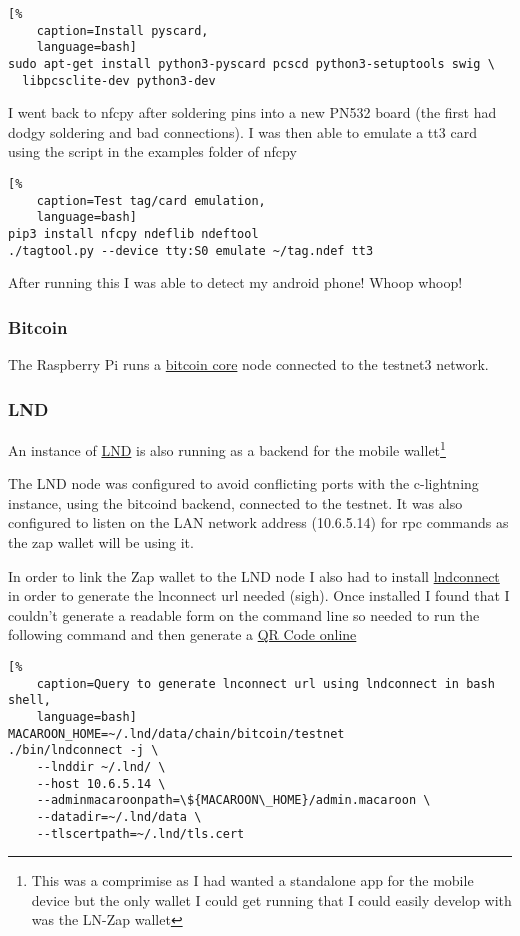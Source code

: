 \documentclass[a4paper]{article}
\begin{document}
\begin{lstlisting}[%
	caption=Install pyscard,
	language=bash]
sudo apt-get install python3-pyscard pcscd python3-setuptools swig \
  libpcsclite-dev python3-dev
\end{lstlisting}

I went back to nfcpy after soldering pins into a new PN532 board (the first had 
dodgy soldering and bad connections).
I was then able to emulate a tt3 card using the script in the examples folder
of nfcpy
\begin{lstlisting}[%
	caption=Test tag/card emulation,
	language=bash]
pip3 install nfcpy ndeflib ndeftool
./tagtool.py --device tty:S0 emulate ~/tag.ndef tt3
\end{lstlisting}

After running this I was able to detect my android phone! Whoop whoop!

\subsubsection{Bitcoin}
The Raspberry Pi runs a \href{https://github.com/bitcoin/bitcoin}{bitcoin core} node
connected to the testnet3 network.

\subsubsection{LND}
An instance of \href{https://github.com/lightningnetwork/lnd}{LND} is also running as
a backend for the mobile wallet\footnote{This was a comprimise as I had wanted a
standalone app for the mobile device but the only wallet I could get running that I
could easily develop with was the LN-Zap wallet}

The LND node was configured to avoid conflicting ports with the c-lightning instance,
using the bitcoind backend, connected to the testnet.  It was also configured to
listen on the LAN network address (10.6.5.14) for rpc commands as the zap wallet
will be using it.

In order to link the Zap wallet to the LND node I also had to install
\href{https://github.com/LN-Zap/lndconnect}{lndconnect} in order to generate the
lnconnect url needed (sigh).  Once installed I found that I couldn't generate a
readable form on the command line so needed to run the following command and then
generate a \href{https://www.online-qrcode-generator.com/}{QR Code online}

\begin{lstlisting}[%
	caption=Query to generate lnconnect url using lndconnect in bash shell,
	language=bash]
MACAROON_HOME=~/.lnd/data/chain/bitcoin/testnet
./bin/lndconnect -j \
	--lnddir ~/.lnd/ \
	--host 10.6.5.14 \
	--adminmacaroonpath=\${MACAROON\_HOME}/admin.macaroon \
	--datadir=~/.lnd/data \
	--tlscertpath=~/.lnd/tls.cert
\end{lstlisting}
\end{document}
